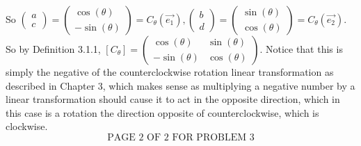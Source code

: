 \documentclass[12pt]{article}
\newenvironment{problem}[2][Problem]
{
	\begin{trivlist} 
		\item[\hskip \labelsep {\bfseries #1 #2:}]
	}
{
	\end{trivlist}
	}
\begin{document}
\begin{problem}{6}
So $\begin{pmatrix}a\\c\end{pmatrix}=\begin{pmatrix} \cos (\theta)\\ -\sin (\theta) \end{pmatrix}=C_{\theta}(\vec{e_{1}}),\begin{pmatrix}b\\d\end{pmatrix}=\begin{pmatrix} \sin (\theta)\\ \cos (\theta) \end{pmatrix}=C_{\theta}(\vec{e_{2}})$. So by Definition 3.1.1, $[C_{\theta}]=\begin{pmatrix} \cos (\theta) & \sin(\theta) \\ -\sin(\theta) & \cos(\theta) \end{pmatrix}$. Notice that this is simply the negative of the counterclockwise rotation linear transformation as described in Chapter 3, which makes sense as multiplying a negative number by a linear transformation should cause it to act in the opposite direction, which in this case is a rotation the direction opposite of counterclockwise, which is clockwise.
\noindent
\newline
\newline
\newline
\newline
\newline
\newline
\newline
\newline
\newline
\newline
\newline
\newline
\newline
\newline
\newline
\newline
\newline
\newline
\[
\text{PAGE 2 OF 2 FOR PROBLEM 3}
\]









\end{problem}
\end{document}
